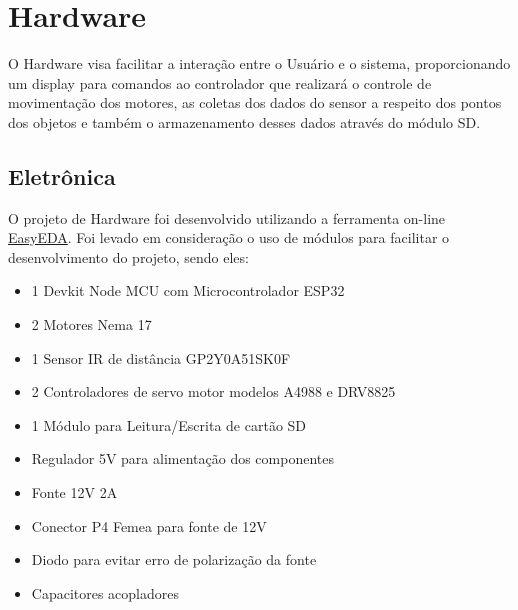 
\chapter{Hardware}\label{cap:Hardware}

O Hardware visa facilitar a interação entre o Usuário e o sistema, proporcionando um display para comandos ao controlador que realizará o controle de movimentação dos motores, as coletas dos dados do sensor a respeito dos pontos dos objetos e também o armazenamento desses dados através do módulo SD. 

\section{Eletrônica}



O projeto de Hardware foi desenvolvido utilizando a ferramenta on-line \href{https://easyeda.com/}{EasyEDA}. Foi levado em consideração o uso de módulos para facilitar o desenvolvimento do projeto, sendo eles:

\begin{itemize}
    \item 1 Devkit Node MCU com Microcontrolador ESP32
    \item 2 Motores Nema 17
    \item 1 Sensor IR de distância GP2Y0A51SK0F
    \item 2 Controladores de servo motor modelos A4988 e DRV8825
    \item 1 Módulo para Leitura/Escrita de cartão SD
    \item Regulador 5V para alimentação dos componentes
    \item Fonte 12V 2A
    \item Conector P4 Femea para fonte de 12V
    \item Diodo para evitar erro de polarização da fonte
    \item Capacitores acopladores
\end{itemize}

